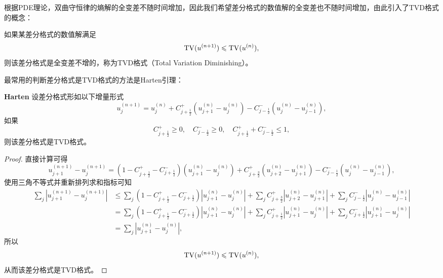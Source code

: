 \documentclass[a4paper,10pt]{ctexart}
\begin{document}
根据PDE理论，双曲守恒律的熵解的全变差不随时间增加，因此我们希望差分格式的数值解的全变差也不随时间增加，由此引入了TVD格式的概念：
\begin{definition}
    如果某差分格式的数值解满足
    \begin{equation}
        {\rm TV}(u^{(n+1)}) \leqslant {\rm TV}(u^{(n)}),
    \end{equation}
    则该差分格式是全变差不增的，称为TVD格式（Total Variation Diminishing）。
\end{definition}

最常用的判断差分格式是TVD格式的方法是Harten引理：
\begin{lemma}{\normalfont\bf{Harten}}
    设差分格式形如以下增量形式
    \begin{equation}
        u_j^{(n+1)} = u_j^{(n)} + C_{j+\frac{1}{2}}^+ (u_{j+1}^{(n)} - u_j^{(n)}) - C_{j-\frac{1}{2}}^- (u_j^{(n)} - u_{j-1}^{(n)}),
    \end{equation}
    如果
    \begin{equation}
        C_{j+\frac{1}{2}}^+ \geqslant 0, \quad C_{j-\frac{1}{2}}^- \geqslant  0, \quad C_{j+\frac{1}{2}}^+ + C_{j-\frac{1}{2}}^- \leqslant 1,
    \end{equation}
    则该差分格式是TVD格式。
\end{lemma}
\begin{proof}
    直接计算可得
    \[
        u_{j+1}^{(n+1)} - u_{j}^{(n+1)} = (1-C_{j+\frac{1}{2}}^+ - C_{j+\frac{1}{2}}^-) (u_{j+1}^{(n)} - u_{j}^{(n)}) + C_{j+\frac{3}{2}}^+(u_{j+2}^{(n)} - u_{j+1}^{(n)}) - C_{j-\frac{1}{2}}^-(u_{j}^{(n)} - u_{j-1}^{(n)}),
    \]
    使用三角不等式并重新排列求和指标可知
    \[
    \begin{aligned}
        \sum_j |u_{j+1}^{(n+1)} - u_{j}^{(n+1)}| 
        &\leqslant \sum_j (1-C_{j+\frac{1}{2}}^+ - C_{j+\frac{1}{2}}^-)|u_{j+1}^{(n)} - u_{j}^{(n)}| + \sum_j C_{j+\frac{3}{2}}^+|u_{j+2}^{(n)} - u_{j+1}^{(n)}| + \sum_j C_{j-\frac{1}{2}}^-|u_{j}^{(n)} - u_{j-1}^{(n)}| \\
        &= \sum_j (1-C_{j+\frac{1}{2}}^+ - C_{j+\frac{1}{2}}^-)|u_{j+1}^{(n)} - u_{j}^{(n)}| + \sum_j C_{j+\frac{1}{2}}^+|u_{j+1}^{(n)} - u_{j}^{(n)}| + \sum_j C_{j+\frac{1}{2}}^-|u_{j+1}^{(n)} - u_{j}^{(n)}|\\
        &= \sum_j |u_{j+1}^{(n)} - u_{j}^{(n)}|,
    \end{aligned} 
    \]
    所以
    \[
        {\rm TV}(u^{(n+1)})  \leqslant {\rm TV}(u^{(n)}),
    \]
    从而该差分格式是TVD格式。
\end{proof}
\end{document}
